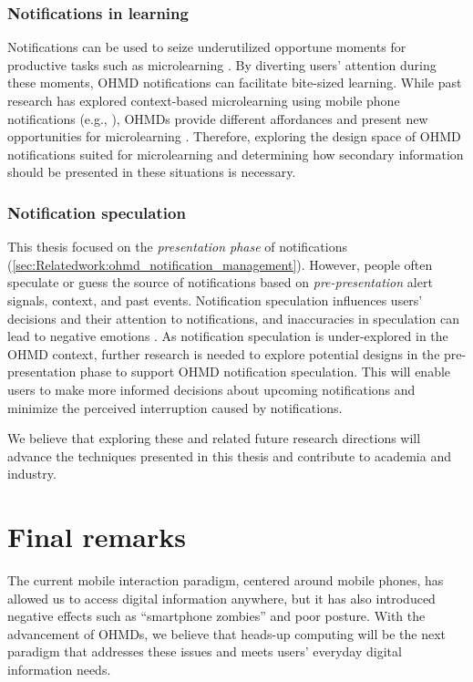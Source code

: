 \subsubsection*{Notifications in learning}

Notifications can be used to seize underutilized opportune moments for productive tasks such as microlearning \cite{isaacs_mobile_2009, cai_waitsuite_2017}. By diverting users' attention during these moments, OHMD notifications can facilitate bite-sized learning. While past research has explored context-based microlearning using mobile phone notifications (e.g., \cite{dingler_language_2017}), OHMDs provide different affordances and present new opportunities for microlearning \cite{janaka_visual_2022}. Therefore, exploring the design space of OHMD notifications suited for microlearning and determining how secondary information should be presented in these situations is necessary.


\subsubsection*{Notification speculation}

This thesis focused on the \textit{presentation phase} of notifications (\autoref{sec:Relatedwork:ohmd_notification_management}). However, people often speculate or guess the source of notifications based on \textit{pre-presentation} alert signals, context, and past events. Notification speculation influences users' decisions and their attention to notifications, and inaccuracies in speculation can lead to negative emotions \cite{chang_i_2019}. As notification speculation is under-explored in the OHMD context, further research is needed to explore potential designs in the pre-presentation phase to support OHMD notification speculation. This will enable users to make more informed decisions about upcoming notifications and minimize the perceived interruption caused by notifications.


\vspace{2em}
We believe that exploring these and related future research directions will advance the techniques presented in this thesis and contribute to academia and industry.


\section{Final remarks}

The current mobile interaction paradigm, centered around mobile phones, has allowed us to access digital information anywhere, but it has also introduced negative effects such as ``smartphone zombies'' and poor posture. With the advancement of OHMDs, we believe that heads-up computing will be the next paradigm that addresses these issues and meets users' everyday digital information needs.

